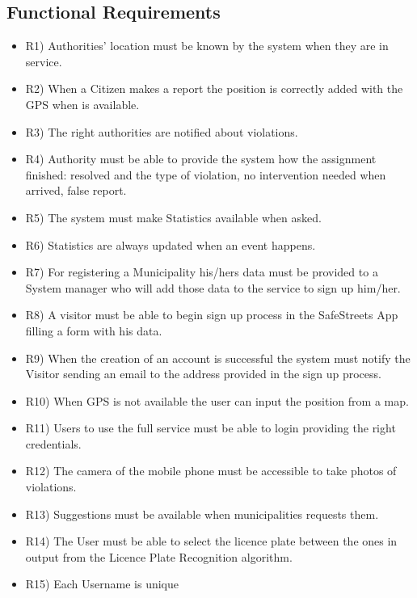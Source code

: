 \subsection{Functional Requirements}
\begin{itemize}

 \item R1) Authorities’ location must be known by the system when they are in service.
\item  R2) When a Citizen makes a report the position is correctly added with the GPS when is available.
\item R3) The right authorities are notified about violations.
 \item R4)  Authority must be able to provide the system how the assignment finished: resolved and the type of violation, no intervention needed when arrived, false report.
 \item R5) The system must make Statistics available when asked.
 \item R6) Statistics are always updated when an event happens.  
\item R7) For registering a Municipality his/hers data must be provided to a System manager who will add those data to the service to sign up him/her.
 \item R8) A visitor must be able to begin sign up process in the SafeStreets App filling a form with his data.
 \item R9) When the creation of an account is successful the system must notify the Visitor sending an email to the address provided in the sign up process. 
 \item R10) When GPS is not available the user can input the position from a map.
 \item R11) Users to use the full service must be able to login providing the right credentials.
\item R12) The camera of the mobile phone must be accessible to take photos of violations.
\item R13) Suggestions must be available when municipalities requests them.
\item R14) The User must be able to select the licence plate between the ones in output from the Licence Plate Recognition algorithm.
\item R15) Each Username is unique
\end{itemize}
